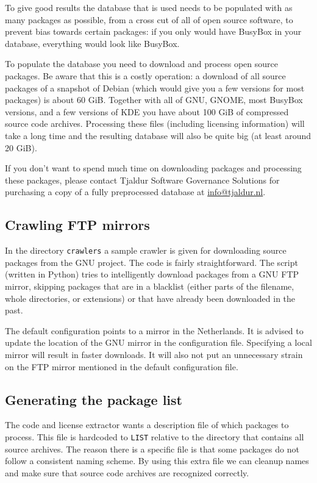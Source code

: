 \documentclass[10pt]{article}
\begin{document}
To give good results the database that is used needs to be populated with as
many packages as possible, from a cross cut of all of open source software, to
prevent bias towards certain packages: if you only would have BusyBox in your
database, everything would look like BusyBox.

To populate the database you need to download and process open source packages.
Be aware that this is a costly operation: a download of all source packages of
a snapshot of Debian (which would give you a few versions for most packages) is
about 60 GiB. Together with all of GNU, GNOME, most BusyBox versions, and a few
versions of KDE you have about 100 GiB of compressed source code archives.
Processing these files (including licensing information) will take a long time
and the resulting database will also be quite big (at least around 20 GiB).

If you don't want to spend much time on downloading packages and processing
these packages, please contact Tjaldur Software Governance Solutions for
purchasing a copy of a fully preprocessed database at \url{info@tjaldur.nl}.

\subsection{Crawling FTP mirrors}

In the directory \texttt{crawlers} a sample crawler is given for downloading
source packages from the GNU project. The code is fairly straightforward. The
script (written in Python) tries to intelligently download packages from a GNU
FTP mirror, skipping packages that are in a blacklist (either parts of the
filename, whole directories, or extensions) or that have already been
downloaded in the past.

The default configuration points to a mirror in the Netherlands. It is advised
to update the location of the GNU mirror in the configuration file. Specifying
a local mirror will result in faster downloads. It will also not put an
unnecessary strain on the FTP mirror mentioned in the default configuration
file.

\subsection{Generating the package list}

The code and license extractor wants a description file of which packages to
process. This file is hardcoded to \texttt{LIST} relative to the directory that
contains all source archives. The reason there is a specific file is that some
packages do not follow a consistent naming scheme. By using this extra file we
can cleanup names and make sure that source code archives are recognized
correctly.
\end{document}
